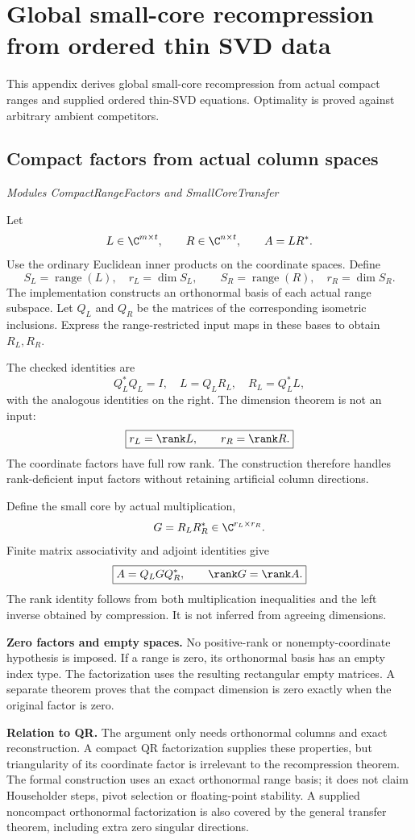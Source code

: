 \clearpage\FloatBarrier\section{Global small-core recompression from ordered thin SVD data}\label{supp6:section:001}
This appendix derives global small-core recompression from actual compact ranges and supplied ordered thin-SVD equations. Optimality is proved against arbitrary ambient competitors.\par

\subsection{Compact factors from actual column spaces}\label{supp6:subsection:001}\textit{Modules CompactRangeFactors and SmallCoreTransfer}\par
Let
\[
L\in\C^{m\times t},\qquad R\in\C^{n\times t},\qquad A=LR^*.
\]
Use the ordinary Euclidean inner products on the coordinate spaces. Define
\[
S_L=\operatorname{range}(L),\quad r_L=\dim S_L,
\qquad S_R=\operatorname{range}(R),\quad r_R=\dim S_R.
\]
The implementation constructs an orthonormal basis of each actual range subspace. Let $Q_L$ and $Q_R$ be the matrices of the corresponding isometric inclusions. Express the range-restricted input maps in these bases to obtain $R_L,R_R$.

The checked identities are
\[
\boxed{Q_L^*Q_L=I,\quad L=Q_LR_L,\quad R_L=Q_L^*L,}
\]
with the analogous identities on the right. The dimension theorem is not an input:
\[
\boxed{r_L=\rank L,\qquad r_R=\rank R.}
\]
The coordinate factors have full row rank. The construction therefore handles rank-deficient input factors without retaining artificial column directions.

Define the small core by actual multiplication,
\[
G=R_LR_R^*\in\C^{r_L\times r_R}.
\]
Finite matrix associativity and adjoint identities give
\[
\boxed{A=Q_LGQ_R^*,\qquad \rank G=\rank A.}
\]
The rank identity follows from both multiplication inequalities and the left inverse obtained by compression. It is not inferred from agreeing dimensions.

\textbf{Zero factors and empty spaces.} No positive-rank or nonempty-coordinate hypothesis is imposed. If a range is zero, its orthonormal basis has an empty index type. The factorization uses the resulting rectangular empty matrices. A separate theorem proves that the compact dimension is zero exactly when the original factor is zero.

\textbf{Relation to QR.} The argument only needs orthonormal columns and exact reconstruction. A compact QR factorization supplies these properties, but triangularity of its coordinate factor is irrelevant to the recompression theorem. The formal construction uses an exact orthonormal range basis; it does not claim Householder steps, pivot selection or floating-point stability. A supplied noncompact orthonormal factorization is also covered by the general transfer theorem, including extra zero singular directions.



